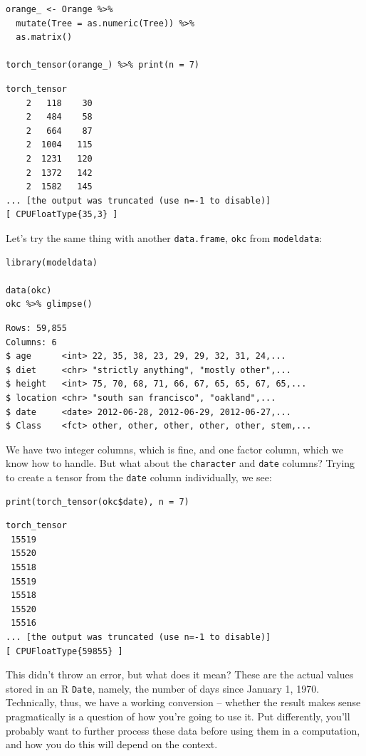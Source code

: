 \documentclass[
  letterpaper,
]{krantz}
\begin{document}
\begin{verbatim}
orange_ <- Orange %>% 
  mutate(Tree = as.numeric(Tree)) %>%
  as.matrix()

torch_tensor(orange_) %>% print(n = 7)
\end{verbatim}

\begin{verbatim}
torch_tensor
    2   118    30
    2   484    58
    2   664    87
    2  1004   115
    2  1231   120
    2  1372   142
    2  1582   145
... [the output was truncated (use n=-1 to disable)]
[ CPUFloatType{35,3} ]
\end{verbatim}

Let's try the same thing with another \texttt{data.frame}, \texttt{okc}
from \texttt{modeldata}:

\begin{verbatim}
library(modeldata)

data(okc)
okc %>% glimpse()
\end{verbatim}

\begin{verbatim}
Rows: 59,855
Columns: 6
$ age      <int> 22, 35, 38, 23, 29, 29, 32, 31, 24,...
$ diet     <chr> "strictly anything", "mostly other",...
$ height   <int> 75, 70, 68, 71, 66, 67, 65, 65, 67, 65,...
$ location <chr> "south san francisco", "oakland",... 
$ date     <date> 2012-06-28, 2012-06-29, 2012-06-27,...
$ Class    <fct> other, other, other, other, other, stem,...
\end{verbatim}

We have two integer columns, which is fine, and one factor column, which
we know how to handle. But what about the \texttt{character} and
\texttt{date} columns? Trying to create a tensor from the \texttt{date}
column individually, we see:

\begin{verbatim}
print(torch_tensor(okc$date), n = 7)
\end{verbatim}

\begin{verbatim}
torch_tensor
 15519
 15520
 15518
 15519
 15518
 15520
 15516
... [the output was truncated (use n=-1 to disable)]
[ CPUFloatType{59855} ]
\end{verbatim}

This didn't throw an error, but what does it mean? These are the actual
values stored in an R \texttt{Date}, namely, the number of days since
January 1, 1970. Technically, thus, we have a working conversion --
whether the result makes sense pragmatically is a question of how you're
going to use it. Put differently, you'll probably want to further
process these data before using them in a computation, and how you do
this will depend on the context.
\end{document}
